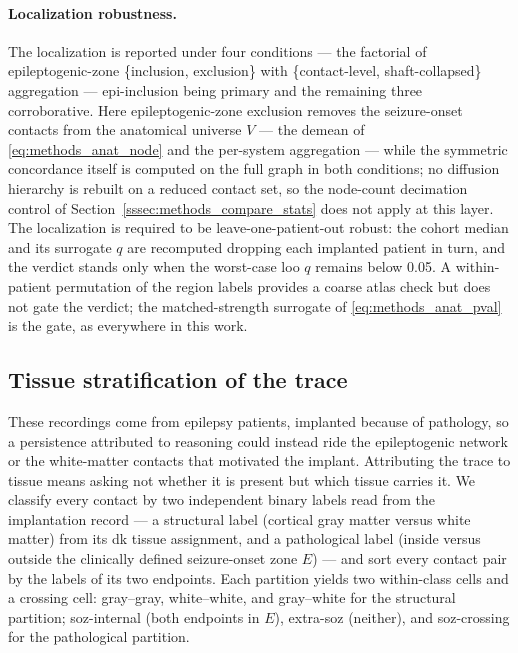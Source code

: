 \paragraph{Localization robustness.}
The localization is reported under four conditions --- the factorial of epileptogenic-zone \{inclusion, exclusion\} with \{contact-level, shaft-collapsed\} aggregation --- epi-inclusion being primary and the remaining three corroborative. Here epileptogenic-zone exclusion removes the seizure-onset contacts from the anatomical universe \(V\) --- the demean of \eqref{eq:methods_anat_node} and the per-system aggregation --- while the symmetric concordance itself is computed on the full graph in both conditions; no diffusion hierarchy is rebuilt on a reduced contact set, so the node-count decimation control of Section~\ref{sssec:methods_compare_stats} does not apply at this layer. The localization is required to be leave-one-patient-out robust: the cohort median and its surrogate \(q\) are recomputed dropping each implanted patient in turn, and the verdict stands only when the worst-case \gls{loo} \(q\) remains below \num{0.05}. A within-patient permutation of the region labels provides a coarse atlas check but does not gate the verdict; the matched-strength surrogate of \eqref{eq:methods_anat_pval} is the gate, as everywhere in this work.

\subsection{Tissue stratification of the trace}
\label{ssec:methods_tissue}

These recordings come from epilepsy patients, implanted because of pathology, so a persistence attributed to reasoning could instead ride the epileptogenic network or the white-matter contacts that motivated the implant. Attributing the trace to tissue means asking not whether it is present but which tissue carries it. We classify every contact by two independent binary labels read from the implantation record --- a structural label (cortical gray matter versus white matter) from its \gls{dk} tissue assignment, and a pathological label (inside versus outside the clinically defined seizure-onset zone \(E\)) --- and sort every contact pair by the labels of its two endpoints. Each partition yields two within-class cells and a crossing cell: gray--gray, white--white, and gray--white for the structural partition; \gls{soz}-internal (both endpoints in \(E\)), extra-\gls{soz} (neither), and \gls{soz}-crossing for the pathological partition.

